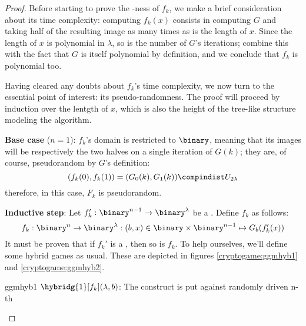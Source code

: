 \begin{proof}

    Before starting to prove the \prf-ness of $f_k$, we make a brief consideration about its time complexity: computing $f_k(x)$ consists in computing $G$ and taking half of the resulting image as many times as is the length of $x$. Since the length of $x$ is polynomial in $\lambda$, so is the number of $G$'s iterations; combine this with the fact that $G$ is itself polynomial by definition, and we conclude that $f_k$ is polynomial too.

    Having cleared any doubts about $f_k$'s time complexity, we now turn to the essential point of interest: its pseudo-randomness. The proof will proceed by induction over the lentgth of $x$, which is also the height of the tree-like structure modeling the algorithm.
    
    \textbf{Base case} ($n = 1$): $f_k$'s domain is restricted to $\binary$, meaning that its images will be respectively the two halves on a single iteration of $G(k)$; they are, of course, pseudorandom by $G$'s definition:
    \[
        (f_k(0), f_k(1)) = (G_0(k), G_1(k)) \compindist U_{2\lambda}
    \]
    therefore, in this case, $F_k$ is pseudorandom.

    \textbf{Inductive step}: Let $f'_k : \binary^{n - 1} \to \binary^\lambda$ be a \prf. Define $f_k$ as follows:
    \[
        f_k : \binary^n \to \binary^\lambda : (b, x) \in \binary \times \binary^{n - 1} \mapsto G_b(f'_k(x))
    \]
    It must be proven that if $f_k'$ is a \prf, then so is $f_k$. To help ourselves, we'll define some hybrid games as usual. These are depicted in figures \ref{cryptogame:ggmhyb1} and \ref{cryptogame:ggmhyb2}.

    \begin{cryptogame}
        {ggmhyb1}
        {$\hybridg{1}[f_k](\lambda, b)$: The \ggm{} construct is put against randomly driven \prg}
        {n-th}


        \cseqdelay
        \cseqbeginloop
        \cseqendloop
        \cseqdelay


\end{cryptogame}
\end{proof}
